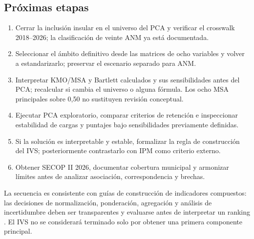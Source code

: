 \subsection{Próximas etapas}

\begin{enumerate}[leftmargin=1.27cm]
  \item Cerrar la inclusión insular en el universo del PCA y verificar el crosswalk 2018--2026; la clasificación de veinte ANM ya está documentada.
  \item Seleccionar el ámbito definitivo desde las matrices de ocho variables y volver a estandarizarlo; preservar el escenario separado para ANM.
  \item Interpretar KMO/MSA y Bartlett calculados y sus sensibilidades antes del PCA; recalcular si cambia el universo o alguna fórmula. Los ocho MSA principales sobre 0,50 no sustituyen revisión conceptual.
  \item Ejecutar PCA exploratorio, comparar criterios de retención e inspeccionar estabilidad de cargas y puntajes bajo sensibilidades previamente definidas.
  \item Si la solución es interpretable y estable, formalizar la regla de construcción del IVS; posteriormente contrastarlo con IPM como criterio externo.
  \item Obtener SECOP II 2026, documentar cobertura municipal y armonizar límites antes de analizar asociación, correspondencia y brechas.
\end{enumerate}

La secuencia es consistente con guías de construcción de indicadores compuestos: las decisiones de normalización, ponderación, agregación y análisis de incertidumbre deben ser transparentes y evaluarse antes de interpretar un ranking \citep{oecd2008composite}. El IVS no se considerará terminado solo por obtener una primera componente principal.
